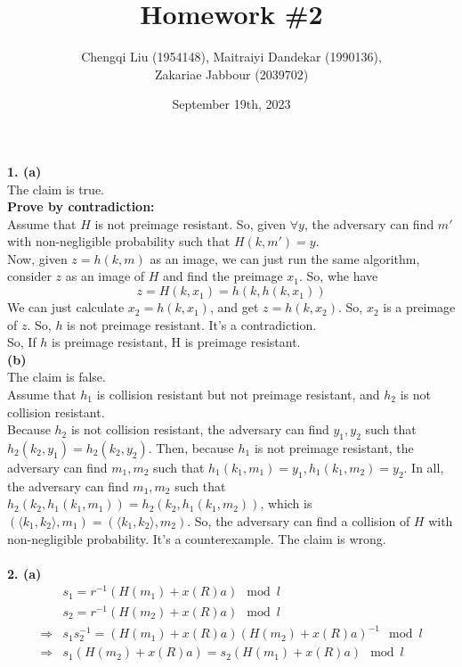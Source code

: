 \documentclass[
	12pt, %
]{fphw}
\title{Homework \#2} %
\author{Chengqi Liu (1954148), Maitraiyi Dandekar (1990136),\\ Zakariae Jabbour (2039702)} %
\date{September 19th, 2023} %
\institute{Eindhoven University of Technology} %
\begin{document}
\maketitle %

\textbf{1. (a)\\}
The claim is true.\\
\textbf{Prove by contradiction:\\}
Assume that $H$ is not preimage resistant. So, given $\forall y$, the adversary can find $m'$ with non-negligible probability such that $H(k,m')=y$.\\
Now, given $z=h(k,m)$ as an image, we can just run the same algorithm, consider $z$ as an image of $H$ and find the preimage $x_1$. So, whe have
\[
	z=H(k,x_1)=h(k,h(k,x_1))
\]
We can just calculate $x_2=h(k,x_1)$, and get $z=h(k,x_2)$. So, $x_2$ is a preimage of $z$. So, $h$ is not preimage resistant. It's a contradiction.\\
So, If $h$ is preimage resistant, H is preimage resistant.\\
\textbf{(b)}\\
The claim is false.\\
Assume that $h_1$ is collision resistant but not preimage resistant, and $h_2$ is not collision resistant.\\
Because $h_2$ is not collision resistant, the adversary can find $y_1,y_2$ such that $h_2(k_2,y_1)=h_2(k_2,y_2)$. Then, because $h_1$ is not preimage resistant, the adversary can find $m_1,m_2$ such that $h_1(k_1,m_1)=y_1,h_1(k_1,m_2)=y_2$. In all, the adversary can find $m_1,m_2$ such that $h_2(k_2,h_1(k_1,m_1))=h_2(k_2,h_1(k_1,m_2))$, which is $(\langle k_1,k_2\rangle,m_1)=(\langle k_1,k_2\rangle,m_2)$. So, the adversary can find a collision of $H$ with non-negligible probability. It's a counterexample. The claim is wrong.\\
\\
\textbf{2. (a)}
\begin{align*}
	&s_1=r^{-1}(H(m_1)+x(R)a) \mod l\\
	&s_2=r^{-1}(H(m_2)+x(R)a) \mod l\\
	\Rightarrow&s_1s_2^{-1}=(H(m_1)+x(R)a)(H(m_2)+x(R)a)^{-1} \mod l\\
	\Rightarrow&s_1(H(m_2)+x(R)a)=s_2(H(m_1)+x(R)a) \mod l
\end{align*}
\end{document}
